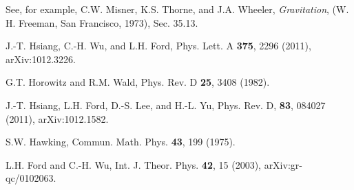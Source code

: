 \documentclass[preprint,prd,showpacs,superscriptaddress]{revtex4}
\begin{document}
\begin{thebibliography}{99}
 See, for example, C.W. Misner, K.S. Thorne, and J.A. Wheeler, {\it Gravitation}, 
(W. H. Freeman, San Francisco, 1973), Sec. 35.13.

 J.-T. Hsiang, C.-H. Wu, and L.H. Ford, Phys. Lett. A 
{\bf 375}, 2296 (2011), arXiv:1012.3226.

 G.T. Horowitz and R.M. Wald,  Phys. Rev. D {\bf 25}, 3408 (1982).

 J.-T. Hsiang, L.H. Ford, D.-S. Lee, and  H.-L. Yu, Phys. Rev. D,
{\bf 83}, 084027 (2011),  arXiv:1012.1582.

 S.W. Hawking, Commun. Math. Phys. {\bf 43}, 199 (1975).

 L.H. Ford and  C.-H. Wu, Int. J. Theor. Phys. {\bf 42}, 15 (2003), arXiv:gr-qc/0102063.

\end{thebibliography}
\end{document}
